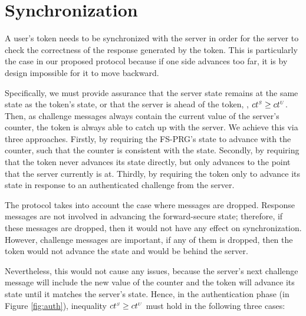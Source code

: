 


\section{Synchronization}
\label{app:synchronisation}

A user's token needs to be synchronized with the server
in order for the server to check the correctness of the response generated by the token.
This is particularly the case in our proposed protocol because
if one side advances too far, it is by design impossible for it to
move backward. 

Specifically, we must provide assurance that the server state remains at the same state as the token's state, or that the server is ahead of the token, \ie, ${ct}^{\scriptscriptstyle S} \geq {ct}^{\scriptscriptstyle U}$. Then, as challenge messages always contain the current value of the server's counter, the token is always able to catch up with the server. We achieve this via three approaches.  Firstly, by requiring the FS-PRG's state to advance with the counter, such that the counter is consistent with the state. Secondly, by requiring that the token never advances its state directly, but only advances to the point that the server currently is at. Thirdly, by requiring the token only to advance its state in response to an authenticated challenge from the server.%


The protocol takes into account the case where messages are dropped.
Response messages are not involved in advancing the forward-secure state; therefore, if these messages are dropped, then it would not have any effect on synchronization. However, challenge messages are important, if any of them is dropped, then the token would not advance the state and would be behind the server. 

Nevertheless, this would not cause any issues, because the server's next challenge message will include the new value of the counter and the token will advance its state until it matches the server's state. Hence, in the authentication phase (in Figure \ref{fig:auth}), inequality ${ct}^{\scriptscriptstyle S} \geq {ct}^{\scriptscriptstyle U}$ must hold in the following three cases:  


